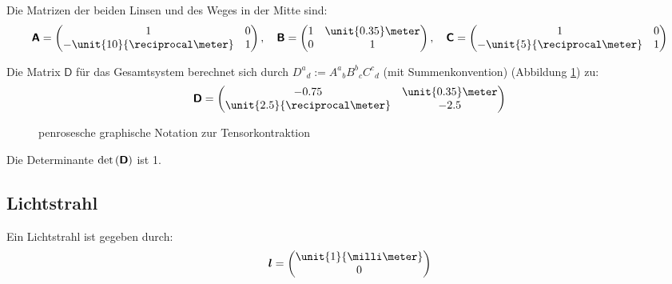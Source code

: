\documentclass[11pt, ngerman, fleqn]{article}
\newcommand{\tens}[1]{\boldsymbol{\mathsf{#1}}}
\renewcommand{\vec}[1]{\boldsymbol{#1}}
\begin{document}
Die Matrizen der beiden Linsen und des Weges in der Mitte sind:
\[
	\tens A = \begin{pmatrix}
		1 & 0 \\ - \unit{10}{\reciprocal \meter} & 1
	\end{pmatrix}
	,\quad
	\tens B = \begin{pmatrix}
		1 & \unit{0.35}\meter \\ 0 & 1
	\end{pmatrix}
	,\quad
	\tens C = \begin{pmatrix}
		1 & 0 \\ - \unit{5}{\reciprocal \meter} & 1
	\end{pmatrix}
\]

Die Matrix $\tens D$ für das Gesamtsystem berechnet sich durch $D^a{}_d :=
A^a{}_b B^b{}_c C^c{}_d$ (mit Summenkonvention) (Abbildung \ref{fig:penrose})
zu:
\[
	\tens D = \begin{pmatrix}
		-0.75 & \unit{0.35} \meter \\ \unit{2.5}{\reciprocal \meter} & -2.5
	\end{pmatrix}
\]

\begin{figure}
	\centering
	\caption{penrosesche graphische Notation zur Tensorkontraktion}
	\label{fig:penrose}
\end{figure}

Die Determinante $\det\del{\tens D}$ ist 1.

\subsection{Lichtstrahl}

Ein Lichtstrahl ist gegeben durch:
\[
	\vec l = \begin{pmatrix}
		\unit{1}{\milli\meter} \\ 0
	\end{pmatrix}
\]
\end{document}
